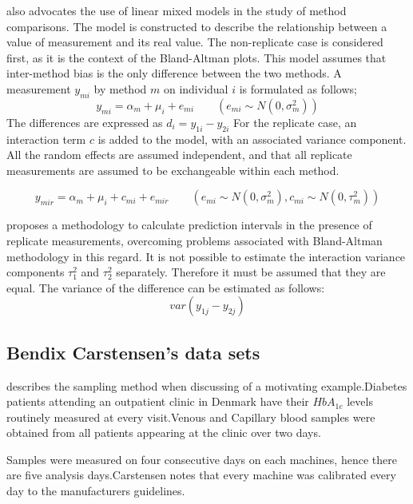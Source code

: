 \documentclass{report}
\begin{document}
\citet{BXC2004} also advocates the use of linear mixed models in
the study of method comparisons. The model is constructed to
describe the relationship between a value of measurement and its
real value. The non-replicate case is considered first, as it is
the context of the Bland-Altman plots. This model assumes that
inter-method bias is the only difference between the two methods.
A measurement $y_{mi}$ by method $m$ on individual $i$ is
formulated as follows;
\begin{equation}
	y_{mi}  = \alpha_{m} + \mu_{i} + e_{mi} \qquad ( e_{mi} \sim
	N(0,\sigma^{2}_{m}))
\end{equation}
The differences are expressed as $d_{i} = y_{1i} - y_{2i}$ For the
replicate case, an interaction term $c$ is added to the model,
with an associated variance component. All the random effects are
assumed independent, and that all replicate measurements are
assumed to be exchangeable within each method.

\begin{equation}
	y_{mir}  = \alpha_{m} + \mu_{i} + c_{mi} + e_{mir} \qquad ( e_{mi}
	\sim N(0,\sigma^{2}_{m}), c_{mi} \sim N(0,\tau^{2}_{m}))
\end{equation}

\citet{BXC2008} proposes a methodology to calculate prediction
intervals in the presence of replicate measurements, overcoming
problems associated with Bland-Altman methodology in this regard.
It is not possible to estimate the interaction variance components
$\tau^{2}_{1}$ and $\tau^{2}_{2}$ separately. Therefore it must be
assumed that they are equal. The variance of the difference can be
estimated as follows:
\begin{equation}
	var(y_{1j}-y_{2j})
\end{equation}


\newpage

\subsection{Bendix Carstensen's data sets}
\citet{bxc2008}describes the sampling method when discussing of a motivating example.Diabetes patients attending an outpatient clinic in Denmark have their $HbA_{1c}$ levels routinely measured at every visit.Venous and Capillary blood samples were obtained from all patients appearing at the clinic over two days.

Samples were measured on four consecutive days on each machines, hence there are five analysis days.Carstensen notes that every machine was calibrated every day to  the manufacturers guidelines.
\end{document}

